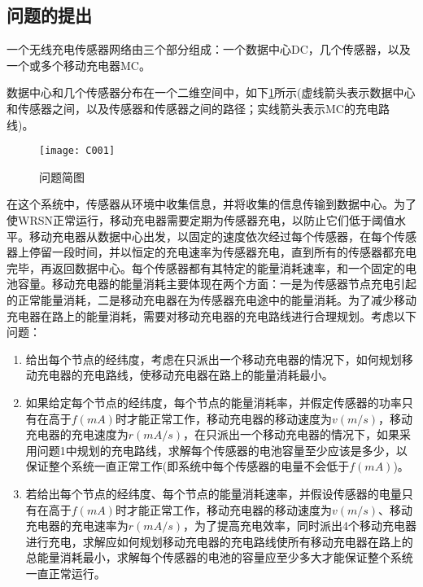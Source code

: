 \documentclass[withoutpreface,bwprint]{cumcmthesis} %
\begin{document}
\subsection{问题的提出}
一个无线充电传感器网络由三个部分组成：一个数据中心DC，几个传感器，以及一个或多个移动充电器MC。\par
数据中心和几个传感器分布在一个二维空间中，如下\ref{fig:simple}所示(虚线箭头表示数据中心和传感器之间，以及传感器和传感器之间的路径；实线箭头表示MC的充电路线)。\par
\begin{figure}[!h]
    \centering
    \texttt{[image: C001]}
    \caption{问题简图}
    \label{fig:simple}
\end{figure}
在这个系统中，传感器从环境中收集信息，并将收集的信息传输到数据中心。为了使WRSN正常运行，移动充电器需要定期为传感器充电，以防止它们低于阈值水平。移动充电器从数据中心出发，以固定的速度依次经过每个传感器，在每个传感器上停留一段时间，并以恒定的充电速率为传感器充电，直到所有的传感器都充电完毕，再返回数据中心。每个传感器都有其特定的能量消耗速率，和一个固定的电池容量。移动充电器的能量消耗主要体现在两个方面：一是为传感器节点充电引起的正常能量消耗，二是移动充电器在为传感器充电途中的能量消耗。为了减少移动充电器在路上的能量消耗，需要对移动充电器的充电路线进行合理规划。考虑以下问题：
\begin{enumerate}[itemsep=0pt,parsep=0pt,label=(\arabic*)]
\item 给出每个节点的经纬度，考虑在只派出一个移动充电器的情况下，如何规划移动充电器的充电路线，使移动充电器在路上的能量消耗最小。
\item 如果给定每个节点的经纬度，每个节点的能量消耗率，并假定传感器的功率只有在高于$f(mA)$时才能正常工作，移动充电器的移动速度为$v(m/s)$，移动充电器的充电速度为$r(mA/s)$，在只派出一个移动充电器的情况下，如果采用问题1中规划的充电路线，求解每个传感器的电池容量至少应该是多少，以保证整个系统一直正常工作(即系统中每个传感器的电量不会低于$f(mA)$)。
\item 若给出每个节点的经纬度、每个节点的能量消耗速率，并假设传感器的电量只有在高于$f(mA)$时才能正常工作，移动充电器的移动速度为$v(m/s)$、移动充电器的充电速率为$r(mA/s)$，为了提高充电效率，同时派出4个移动充电器进行充电，求解应如何规划移动充电器的充电路线使所有移动充电器在路上的总能量消耗最小，求解每个传感器的电池的容量应至少多大才能保证整个系统一直正常运行。
\end{enumerate}
\end{document}
